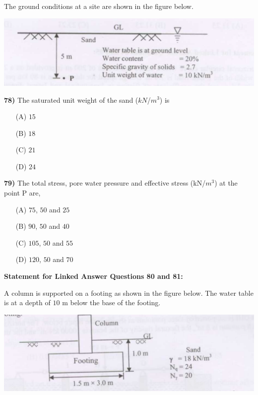 \documentclass[journal]{IEEEtran}
\begin{document}
\begin{enumerate}
The ground conditions at a site are shown in the figure below.

\vspace{0.3cm}
\includegraphics[width=0.8\columnwidth]{figs/fig12.png}
\vspace{0.3cm}

\textbf{78)} The saturated unit weight of the sand ($kN$/$m^{3}$) is \textbf{}
\begin{itemize}
    \item[(A)] $15$
    \item[(B)] $18$
    \item[(C)] $21$
    \item[(D)] $24$
\end{itemize}

\textbf{79)} The total stress, pore water pressure and effective stress (kN/$m^{3}$) at the point P are,  \textbf{}
\begin{itemize}
    \item[(A)] $75$, $50$ and $25$
    \item[(B)] $90$, $50$ and $40$
    \item[(C)] $105$, $50$ and $55$
    \item[(D)] $120$, $50$ and $70$
\end{itemize}



\textbf{Statement for Linked Answer Questions 80 and 81:}

A column is supported on a footing as shown in the figure below. The water table is at a depth of $10$ m below the base of the footing.

\vspace{0.3cm}
\includegraphics[width=\columnwidth]{figs/fig13.png} 
\vspace{0.3cm}


\end{enumerate}
\end{document}
